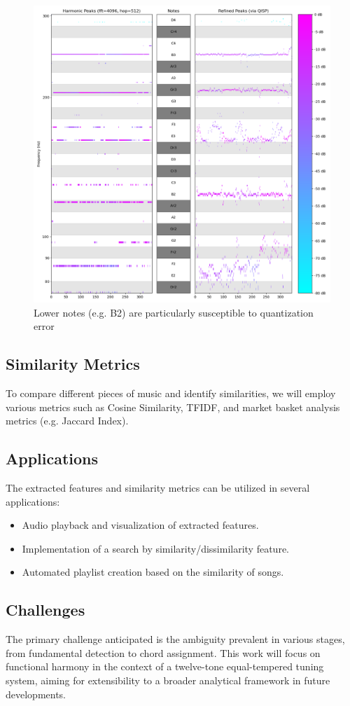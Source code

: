 \begin{figure}[H]
    \centering
    \includegraphics[scale=0.40]{qisp.png}
    \caption{Lower notes (e.g. B2) are particularly susceptible to quantization error}
    \label{fig:qisp}
\end{figure}

\newpage
\subsection{Similarity Metrics}
To compare different pieces of music and identify similarities, we will employ various metrics such as Cosine Similarity, TFIDF, and market basket analysis metrics (e.g. Jaccard Index).

\subsection{Applications}
The extracted features and similarity metrics can be utilized in several applications:
\begin{itemize}
    \item Audio playback and visualization of extracted features.
    \item Implementation of a search by similarity/dissimilarity feature.
    \item Automated playlist creation based on the similarity of songs.
\end{itemize}

\subsection{Challenges}
The primary challenge anticipated is the ambiguity prevalent in various stages, from fundamental detection to chord assignment. This work will focus on functional harmony in the context of a twelve-tone equal-tempered tuning system, aiming for extensibility to a broader analytical framework in future developments.
